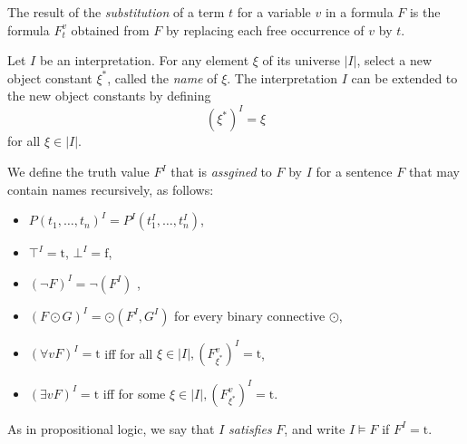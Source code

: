 The result of the \textit{substitution} of a term $t$ for a variable $v$ in a formula $F$ is the formula $F_t^v$ obtained from $F$ by replacing each free occurrence of $v$ by $t$. 

Let $I$ be an interpretation. For any element $\xi$ of its universe $|I|$, select a new object constant $\xi^*$, called the \textit{name} of $\xi$. The interpretation $I$ can be extended to the new object constants by defining 
\begin{equation*}
(\xi^*)^I = \xi
\end{equation*}
for all $\xi \in |I|$. 

We define the truth value $F^I$ that is \textit{assgined} to $F$ by $I$ for a sentence $F$ that may contain names recursively, as follows:

\begin{itemize}
\item $P(t_1, \ldots, t_n)^I = P^I(t_1^I, \ldots, t_n^I)$,
\item $\top^I = \mathrm{t}$, $\bot^I = \mathrm{f}$, 
\item $(\neg F)^I = \neg (F^I)$ , 
\item $(F \odot G)^I = \odot(F^I, G^I)$ for every binary connective $\odot$,
\item $(\forall vF)^I = \mathrm{t}$ iff for all $\xi \in |I|, (F^v_{\xi^*})^I = \mathrm{t}$,
\item $(\exists vF)^I = \mathrm{t}$ iff for some $\xi \in |I|, (F^v_{\xi^*})^I = \mathrm{t}$.
\end{itemize}

As in propositional logic, we say that $I$ \textit{satisfies} $F$, and write $I \models F$ if $F^I = \mathrm{t}$. 


